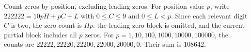 Count zeros by position, excluding leading zeros. For position value $p$, write $222222=10pH+pC+L$ with $0\le C\le9$ and $0\le L<p$. Since each relevant digit $C$ is two, the zero count is $Hp$: the leading-zero block is omitted, and the current partial block includes all $p$ zeros. For $p=1,10,100,1000,10000,100000$, the counts are $22222,22220,22200,22000,20000,0$. Their sum is $\boxed{108642}$.
